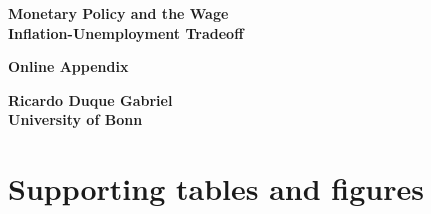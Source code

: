 \documentclass[12pt]{article}
\begin{document}
\begin{appendices}

\setcounter{page}{1}
\setcounter{table}{0}
\setcounter{figure}{0}
\renewcommand{\thepage}{\roman{page}}
\renewcommand{\thetable}{\Alph{section}.\arabic{table}}
\renewcommand{\thefigure}{\Alph{section}.\arabic{figure}}
\renewcommand{\theequation}{\Alph{section}.\arabic{equation}}

\begin{titlepage}

\begin{center}
\textbf{\huge{Monetary Policy and the Wage \\ Inflation-Unemployment Tradeoff}}\\

\vspace{2em}

\textbf{\huge{Online Appendix}}\\

\vspace{2em}

\textbf{\Large{Ricardo Duque Gabriel \\ University of Bonn}}\\
\end{center}

\thispagestyle{empty}

\end{titlepage}

\section{Supporting tables and figures}











\end{appendices}
\end{document}
